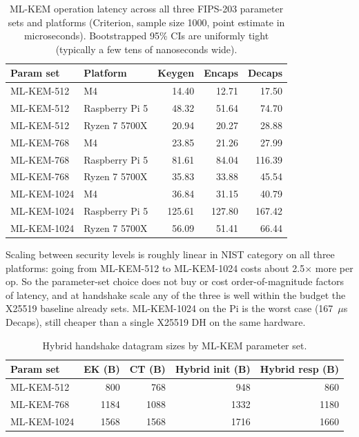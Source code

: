 \documentclass[11pt,a4paper]{article}
\begin{document}
\begin{table}[H]
\centering
\caption{ML-KEM operation latency across all three FIPS-203 parameter sets and platforms (Criterion, sample size 1000, point estimate in microseconds). Bootstrapped 95\% CIs are uniformly tight (typically a few tens of nanoseconds wide).}
\label{tab:mlkem_param_sweep}
\small
\setlength{\tabcolsep}{6pt}
\begin{tabular}{@{}llrrr@{}}
\toprule
\textbf{Param set} & \textbf{Platform} & \textbf{Keygen} & \textbf{Encaps} & \textbf{Decaps} \\
\midrule
ML-KEM-512  & M4              &  14.40 &  12.71 &  17.50 \\
ML-KEM-512  & Raspberry Pi 5  &  48.32 &  51.64 &  74.70 \\
ML-KEM-512  & Ryzen 7 5700X   &  20.94 &  20.27 &  28.88 \\
\midrule
ML-KEM-768  & M4              &  23.85 &  21.26 &  27.99 \\
ML-KEM-768  & Raspberry Pi 5  &  81.61 &  84.04 & 116.39 \\
ML-KEM-768  & Ryzen 7 5700X   &  35.83 &  33.88 &  45.54 \\
\midrule
ML-KEM-1024 & M4              &  36.84 &  31.15 &  40.79 \\
ML-KEM-1024 & Raspberry Pi 5  & 125.61 & 127.80 & 167.42 \\
ML-KEM-1024 & Ryzen 7 5700X   &  56.09 &  51.41 &  66.44 \\
\bottomrule
\end{tabular}
\end{table}

Scaling between security levels is roughly linear in NIST category on all three platforms: going from ML-KEM-512 to ML-KEM-1024 costs about 2.5$\times$ more per op. So the parameter-set choice does not buy or cost order-of-magnitude factors of latency, and at handshake scale any of the three is well within the budget the X25519 baseline already sets. ML-KEM-1024 on the Pi is the worst case (167~$\mu$s Decaps), still cheaper than a single X25519 DH on the same hardware.

\begin{table}[H]
\centering
\caption{Hybrid handshake datagram sizes by ML-KEM parameter set.}
\label{tab:hybrid_msg_sizes_by_param}
\begin{tabular}{@{}lrrrr@{}}
\toprule
\textbf{Param set} & \textbf{EK (B)} & \textbf{CT (B)} & \textbf{Hybrid init (B)} & \textbf{Hybrid resp (B)} \\
\midrule
ML-KEM-512  &  800 &  768 &  948 &  860 \\
ML-KEM-768  & 1184 & 1088 & 1332 & 1180 \\
ML-KEM-1024 & 1568 & 1568 & 1716 & 1660 \\
\bottomrule
\end{tabular}
\end{table}
\end{document}
